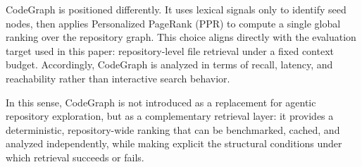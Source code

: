 CodeGraph is positioned differently. It uses lexical signals only to identify seed nodes, then applies Personalized PageRank (PPR) to compute a single global ranking over the repository graph. This choice aligns directly with the evaluation target used in this paper: repository-level file retrieval under a fixed context budget. Accordingly, CodeGraph is analyzed in terms of recall, latency, and reachability rather than interactive search behavior.

In this sense, CodeGraph is not introduced as a replacement for agentic repository exploration, but as a complementary retrieval layer: it provides a deterministic, repository-wide ranking that can be benchmarked, cached, and analyzed independently, while making explicit the structural conditions under which retrieval succeeds or fails.
